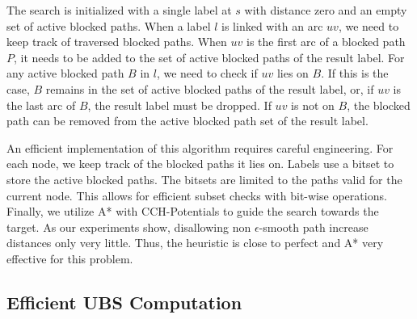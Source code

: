 \documentclass[a4paper,UKenglish,cleveref, autoref, thm-restate]{lipics-v2021}
\begin{document}
The search is initialized with a single label at $s$ with distance zero and an empty set of active blocked paths.
When a label $l$ is linked with an arc $uv$, we need to keep track of traversed blocked paths.
When $uv$ is the first arc of a blocked path $P$, it needs to be added to the set of active blocked paths of the result label.
For any active blocked path $B$ in $l$, we need to check if $uv$ lies on $B$.
If this is the case, $B$ remains in the set of active blocked paths of the result label, or, if $uv$ is the last arc of $B$, the result label must be dropped.
If $uv$ is not on $B$, the blocked path can be removed from the active blocked path set of the result label.

An efficient implementation of this algorithm requires careful engineering.
For each node, we keep track of the blocked paths it lies on.
Labels use a bitset to store the active blocked paths.
The bitsets are limited to the paths valid for the current node.
This allows for efficient subset checks with bit-wise operations.
Finally, we utilize A* with CCH-Potentials to guide the search towards the target.
As our experiments show, disallowing non $\epsilon$-smooth path increase distances only very little.
Thus, the heuristic is close to perfect and A* very effective for this problem.

\subsection{Efficient UBS Computation}
\end{document}
